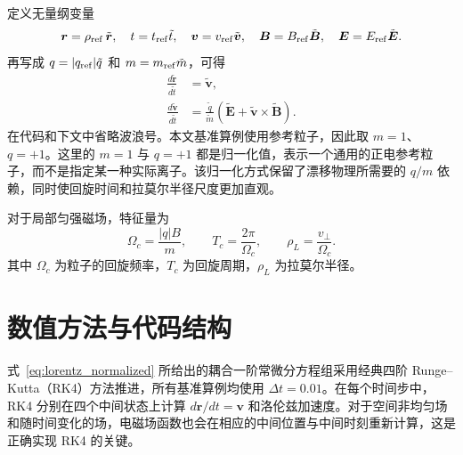 \documentclass[UTF8,11pt,a4paper]{ctexart}
\newcommand{\vect}[1]{\boldsymbol{#1}}
\newcommand{\Ohm}{\Omega_c}
\newcommand{\rhL}{\rho_L}
\begin{document}
定义无量纲变量
\begin{equation}
    \vect{r}=\rho_{\rm ref}\,\tilde{\vect{r}},\quad
    t=t_{\rm ref}\tilde t,\quad
    \vect{v}=v_{\rm ref}\tilde{\vect{v}},\quad
    \vect{B}=B_{\rm ref}\tilde{\vect{B}},\quad
    \vect{E}=E_{\rm ref}\tilde{\vect{E}}.
\end{equation}
再写成 $q=|q_{\rm ref}|\tilde q$ 和 $m=m_{\rm ref}\tilde m$，可得
\begin{align}
    \frac{d\tilde{\vect{r}}}{d\tilde t} &= \tilde{\vect{v}},\\
    \frac{d\tilde{\vect{v}}}{d\tilde t}
    &=\frac{\tilde q}{\tilde m}
    \left(\tilde{\vect{E}}+\tilde{\vect{v}}\times\tilde{\vect{B}}\right).
    \label{eq:lorentz_normalized}
\end{align}
在代码和下文中省略波浪号。本文基准算例使用参考粒子，因此取 $m=1$、$q=+1$。这里的 $m=1$ 与 $q=+1$ 都是归一化值，表示一个通用的正电参考粒子，而不是指定某一种实际离子。该归一化方式保留了漂移物理所需要的 $q/m$ 依赖，同时使回旋时间和拉莫尔半径尺度更加直观。

对于局部匀强磁场，特征量为
\begin{equation}
    \Ohm=\frac{|q|B}{m},
    \qquad
    T_c=\frac{2\pi}{\Ohm},
    \qquad
    \rhL=\frac{v_\perp}{\Ohm}.
\end{equation}
其中 $\Ohm$ 为粒子的回旋频率，$T_c$ 为回旋周期，$\rhL$ 为拉莫尔半径。

\section{数值方法与代码结构}

式~\eqref{eq:lorentz_normalized} 所给出的耦合一阶常微分方程组采用经典四阶 Runge--Kutta（RK4）方法推进，所有基准算例均使用 $\Delta t=0.01$。在每个时间步中，RK4 分别在四个中间状态上计算 $d\vect{r}/dt=\vect{v}$ 和洛伦兹加速度。对于空间非均匀场和随时间变化的场，电磁场函数也会在相应的中间位置与中间时刻重新计算，这是正确实现 RK4 的关键。
\end{document}
